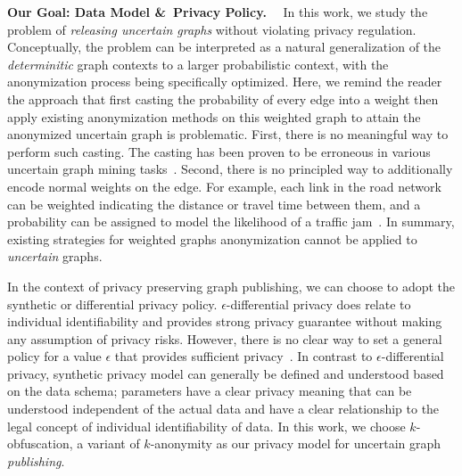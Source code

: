 \textbf{Our Goal: Data Model \&~Privacy Policy.}~~
In this work, we study the problem of \emph{releasing uncertain graphs} without violating privacy regulation. Conceptually, the problem can be interpreted as a natural generalization of the \emph{determinitic} graph contexts to a larger probabilistic context, with the anonymization process being specifically optimized. Here, we remind the reader the approach that first casting the probability of every edge into a weight then apply existing anonymization methods on this weighted graph to attain the anonymized uncertain graph is problematic. First, there is no meaningful way to perform such casting. The casting has been proven to be erroneous in various uncertain graph mining tasks~\cite{Potamias_K_2010,Zhao_Detecting_2014}. Second, there is no principled way to additionally encode normal weights on the edge. For example, each link in the road network can be weighted indicating the distance or travel time between them, and a probability can be assigned to model the likelihood of a traffic jam~\cite{Jin_Distance_2011}. In summary, existing strategies for weighted graphs anonymization cannot be applied to \emph{uncertain} graphs.

In the context of privacy preserving graph publishing, we can choose to adopt the synthetic or differential privacy policy.
$\epsilon$-differential privacy does relate to individual identifiability and provides strong privacy guarantee without making any assumption of privacy risks. However, there is no clear way to set a general policy for a value $\epsilon$ that provides sufficient privacy~\cite{lee2011}. In contrast to $\epsilon$-differential privacy, synthetic privacy model can generally be defined and understood based on the data schema; parameters have a clear privacy meaning that can be understood independent of the actual data and have a clear relationship to the legal concept of individual identifiability of data. In this work, we choose $k$-obfuscation, a variant of $k$-anonymity as our privacy model for uncertain graph \emph{publishing}.

